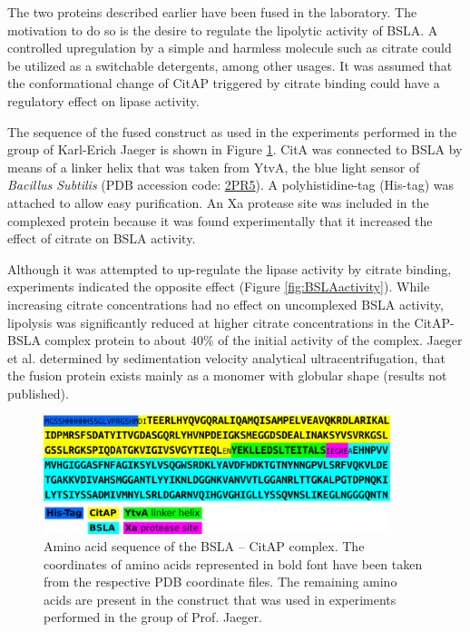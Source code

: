 \documentclass[english, a4paper, 12pt, titlepage, draft]{article}
\begin{document}
The two proteins described earlier have been fused in the laboratory.
The motivation to do so is the desire to regulate the lipolytic activity of BSLA.
A controlled upregulation by a simple and harmless molecule such as citrate could be utilized as a switchable detergents, among other usages.
It was assumed that the conformational change of CitAP triggered by citrate binding could have a regulatory effect on lipase activity.

The sequence of the fused construct as used in the experiments performed in the group of Karl-Erich Jaeger is shown in Figure \ref{fig:complex_sequence}.
CitA was connected to BSLA by means of a linker helix that was taken from YtvA, the blue light sensor of \textit{Bacillus Subtilis} (PDB accession code: \href{http://pdb.rcsb.org/pdb/explore/explore.do?structureId=2PR5}{2PR5}).
A polyhistidine-tag (His-tag) was attached to allow easy purification.
An Xa protease site was included in the complexed protein because it was found experimentally that it increased the effect of citrate on BSLA activity.

Although it was attempted to up-regulate the lipase activity by citrate binding, experiments indicated the opposite effect (Figure \ref{fig:BSLAactivity}).
While increasing citrate concentrations had no effect on uncomplexed BSLA activity, lipolysis was significantly reduced at higher citrate concentrations in the CitAP-BSLA complex protein to about 40\% of the initial activity of the complex.
Jaeger et al. determined by sedimentation velocity analytical ultracentrifugation, that the fusion protein exists mainly as a monomer with globular shape (results not published).




\begin{figure}
    \centering
    \includegraphics[width=0.9\textwidth]{figures/Complex_sequence/Complex_sequence.pdf}
    \caption{Amino acid sequence of the BSLA -- CitAP complex. The coordinates of amino acids represented in bold font have been taken from the respective PDB coordinate files.
    The remaining amino acids are present in the construct that was used in experiments performed in the group of Prof. Jaeger.}
    \label{fig:complex_sequence}
\end{figure}       
\end{document}
